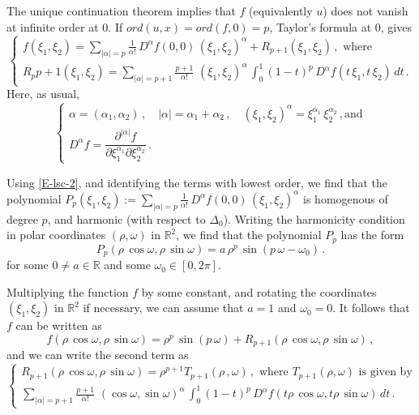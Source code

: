 \documentclass[12pt,a4paper]{amsart}
\theoremstyle{plain} %
\theoremstyle{definition}
\numberwithin{equation}{section}
\numberwithin{figure}{section}
\numberwithin{table}{section}
\newcommand{\R}{\mathbb{R}}
\begin{document}
The unique continuation theorem \cite{Aron1957,DoFe1990a} implies that $f$ (equivalently $u$) does not vanish at infinite order at $0$.  If $ord(u,x)= ord(f,0)=p$, Taylor's formula at $0$, gives
%
\begin{equation}\label{E-lsc-4}
\left\{
\begin{array}{l}
f(\xi_1,\xi_2) = \sum_{|\alpha| = p} \frac{1}{\alpha!}\, D^{\alpha}\!f(0,0)\,(\xi_1,\xi_2)^{\alpha} + R_{p+1}(\xi_1,\xi_2)\,, \text{~where}\\[8pt]
R_p{p+1}(\xi_1,\xi_2) = \sum_{|\alpha| = p+1} \frac{p+1}{\alpha!}\, \,(\xi_1,\xi_2)^{\alpha} \, {\displaystyle \int_0^1 (1-t)^p\, D^{\alpha}\!f(t\,\xi_1,t\,\xi_2)\,dt}\,.
\end{array}%
\right.
\end{equation}
%
Here,  as usual,
%
\begin{equation}\label{E-lsc-4a}
\left\{
\begin{array}{l}
\alpha = (\alpha_1,\alpha_2)\,, \quad|\alpha| = \alpha_1 + \alpha_2\,, \quad (\xi_1,\xi_2)^{\alpha} = \xi_1^{\alpha_1}\, \xi_2^{\alpha_2}\,, \text{and}\\[5pt]
D^{\alpha}\!f = \dfrac{\partial^{|\alpha|}\!f}{\partial \xi_1^{\alpha_1}\partial \xi_2^{\alpha_2}}\,.
\end{array}%
\right.
\end{equation}

Using \eqref{E-lsc-2}, and identifying the terms with lowest order, we find that the polynomial $P_p(\xi_1,\xi_2) := \sum_{|\alpha| = p} \frac{1}{\alpha!}\, D^{\alpha}\!f(0,0)\,(\xi_1,\xi_2)^{\alpha}$ is homogenous of degree $p$, and harmonic (with respect to $\Delta_0$). Writing the harmonicity condition in polar coordinates $(\rho,\omega)$ in $\R^2$, we find that the polynomial $P_p$ has the form
%
\begin{equation}\label{E-lsc-4b}
P_p(\rho\, \cos \omega, \rho\, \sin \omega) = a \, \rho^p \, \sin(p\,\omega - \omega_0)\,.
\end{equation}
%
for some $0 \not = a \in \R$ and some $\omega_0 \in [0,2\pi]$.\medskip

Multiplying the function $f$ by some constant, and rotating the coordinates $(\xi_1,\xi_2)$ in $\R^2$ if necessary, we can assume that $a=1$ and $\omega_0 = 0$. It follows that $f$ can be written as
%
\begin{equation}\label{E-lsc-6}
f(\rho\, \cos \omega, \rho\, \sin \omega) = \rho^p \, \sin(p\,\omega) + R_{p+1}(\rho\, \cos \omega, \rho\, \sin \omega)\,,
\end{equation}
%
and we can write the second term as
%
\begin{equation}\label{E-lsc-8}
\left\{
\begin{array}{l}
R_{p+1}(\rho\, \cos \omega, \rho\, \sin \omega) = \rho^{p+1}T_{p+1}(\rho\,, \omega)\,, \text{~where~} T_{p+1}(\rho,\omega) \text{~is given by}\\[5pt]
\sum_{|\alpha| = p+1} \frac{p+1}{\alpha!}\, \,(\cos \omega,\sin \omega)^{\alpha} \, {\displaystyle \int_0^1 (1-t)^p\, D^{\alpha}\!f(t\rho\,\cos\omega,t\rho\,\sin\omega)\,dt}\,.
\end{array}%
\right.
\end{equation}
\end{document}
